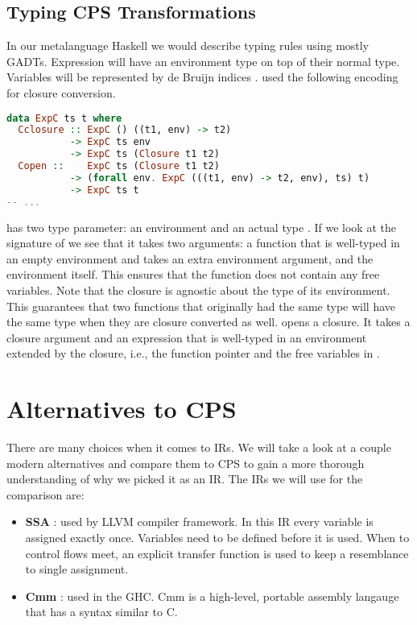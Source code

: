 \subsection{\label{subsection:cpstypetrans}Typing CPS Transformations}
In our metalanguage Haskell we would describe typing rules using mostly GADTs. Expression will have an environment type on top of their normal type. Variables will be represented by de Bruijn indices \autocite{de1972lambda}. \citeauthor{DBLP:conf/haskell/GuillemetteM07} used the following encoding for closure conversion.

\begin{lstlisting}[language=Haskell]
data ExpC ts t where
  Cclosure :: ExpC () ((t1, env) -> t2)
           -> ExpC ts env
           -> ExpC ts (Closure t1 t2)
  Copen ::    ExpC ts (Closure t1 t2)
           -> (forall env. ExpC (((t1, env) -> t2, env), ts) t)
           -> ExpC ts t
-- ...
\end{lstlisting}

 has two type parameter: an environment  and an actual type . If we look at the signature of  we see that it takes two arguments: a function that is well-typed in an empty environment \icode{()} and takes an extra environment argument, and the environment itself. This ensures that the function does not contain any free variables. Note that the closure is agnostic about the type of its environment. This guarantees that two functions that originally had the same type will have the same type when they are closure converted as well.  opens a closure. It takes a closure argument and an expression that is well-typed in an environment extended by the closure, i.e., the function pointer and the free variables in .

\section{\label{section:cpscomp}Alternatives to CPS}
There are many choices when it comes to \acp{IR}. We will take a look at a couple modern alternatives and compare them to \ac{CPS} to gain a more thorough understanding of why we picked it as an \ac{IR}. The \acp{IR} we will use for the comparison are:

\begin{itemize}
\item \textbf{SSA} \autocite{DBLP:journals/toplas/CytronFRWZ91}: used by LLVM \autocite{llvmlangref} compiler framework. In this \ac{IR} every variable is assigned exactly once. Variables need to be defined before it is used. When to control flows meet, an explicit transfer function is used to keep a resemblance to single assignment.
\item \textbf{Cmm} \autocite{DBLP:conf/ppdp/JonesRR99, haskellcmm}: used in the \ac{GHC}. Cmm is a high-level, portable assembly langauge that has a syntax similar to C.
\end{itemize}

